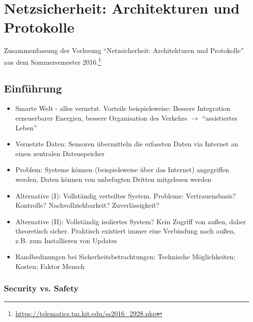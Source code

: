 \chapter{Netzsicherheit: Architekturen und Protokolle}

Zusammenfassung der Vorlesung "`Netzsicherheit: Architekturen und Protokolle"' aus dem Sommersemester 2016.\footnote{\url{https://telematics.tm.kit.edu/ss2016_2928.php}}

\section{Einführung}
\begin{itemize}
	\item Smarte Welt - alles vernetzt. Vorteile beispielsweise: Bessere Integration erneuerbarer Energien, bessere Organisation des Verkehrs \(\rightarrow\) "`assistiertes Leben"'
	\item Vernetzte Daten: Sensoren übermitteln die erfassten Daten via Internet an einen zentralen Datenspeicher
	\item Problem: Systeme können (beispielsweise über das Internet) angegriffen werden, Daten können von unbefugten Dritten mitgelesen werden
	\item Alternative (I): Vollständig verteiltes System. Probleme: Vertrauensbasis? Kontrolle? Nachvollziehbarkeit? Zuverlässigkeit?
	\item Alternative (II): Vollständig isoliertes System? Kein Zugriff von außen, daher theoretisch sicher. Praktisch existiert immer eine Verbindung nach außen, z.B. zum Installieren von Updates
	\item Randbedinungen bei Sicherheitsbetrachtungen: Technische Möglichkeiten; Kosten; Faktor Mensch
\end{itemize}


\subsection{Security vs. Safety}

